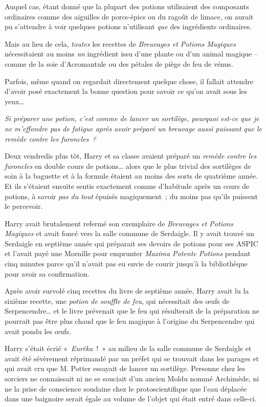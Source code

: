 Auquel cas, étant donné que la plupart des potions utilisaient des composants ordinaires comme des aiguilles de porcs-épics ou du ragoût de limace, on aurait pu s'attendre à voir quelques potions n'utilisant \emph{que} des ingrédients ordinaires.

Mais au lieu de cela, \emph{toutes} les recettes de \emph{Breuvages et Potions Magiques} nécessitaient au moins \emph{un} ingrédient issu d'une plante ou d'un animal magique -- comme de la soie d'Acromantule ou des pétales de piège de feu de vénus.

Parfois, même quand on regardait directement quelque chose, il fallait attendre d'avoir posé exactement la bonne question pour savoir ce qu'on avait sous les yeux…

\emph{Si préparer une potion, c'est comme de lancer un sortilège, pourquoi est-ce que je ne m'effondre pas de fatigue après avoir préparé un breuvage aussi puissant que le remède contre les furoncles~?}

Deux vendredis plus tôt, Harry et sa classe avaient préparé un \emph{remède contre les furoncles} en double cours de potions… alors que le plus trivial des sortilèges de soin à la baguette et à la formule étaient au moins des sorts de quatrième année. Et ils s'étaient ensuite sentis exactement comme d'habitude après un cours de potions, à savoir \emph{pas du tout} épuisés magiquement~; du moins pas qu'ils puissent le percevoir.

Harry avait brutalement refermé son exemplaire de \emph{Breuvages et Potions Magiques} et avait foncé vers la salle commune de Serdaigle. Il y avait trouvé un Serdaigle en septième année qui préparait ses devoirs de potions pour ses ASPIC et l'avait payé une Mornille pour emprunter \emph{Maxima Potente Potions} pendant cinq minutes parce qu'il n'avait pas eu envie de courir jusqu'à la bibliothèque pour avoir sa confirmation.

Après avoir survolé cinq recettes du livre de septième année, Harry avait lu la sixième recette, une \emph{potion de souffle de feu}, qui nécessitait des œufs de Serpencendre… et le livre prévenait que le feu qui résulterait de la préparation ne pourrait pas être plus chaud que le feu magique à l'origine du Serpencendre qui avait pondu les œufs.

Harry s'était écrié «~\emph{Eurêka}~!~» au milieu de la salle commune de Serdaigle et avait été sévèrement réprimandé par un préfet qui se trouvait dans les parages et qui avait cru que M. Potter essayait de lancer un sortilège. Personne chez les sorciers ne connaissait ni ne se souciait d'un ancien Moldu nommé Archimède, ni ne la prise de conscience soudaine chez le protoscientifique que l'eau déplacée dans une baignoire serait égale au volume de l'objet qui était entré dans celle-ci.

